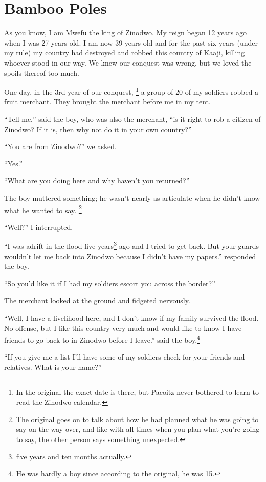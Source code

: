 \chapter{Bamboo Poles}

As you know, I am Mwefu the king of Zinodwo. My reign began 12 years ago when I was 27 years old. I am now 39 years old and for the past six years (under my rule) my country had destroyed and robbed this country of Kaaji, killing whoever stood in our way.
We knew our conquest was wrong, but we loved the spoils thereof too much.

One day, in the 3rd year of our conquest,
\footnote{In the original the exact date is there, but Pacoitz never bothered to learn to read the Zinodwo calendar.}
a group of 20 of my soldiers robbed a fruit merchant. They brought the merchant before me in my tent.

``Tell me,'' said the boy, who was also the merchant, ``is it right to rob a citizen of Zinodwo? If it is, then why not do it in your own country?''

``You are from Zinodwo?'' we asked.

``Yes.''

``What are you doing here and why haven't you returned?''

The boy muttered something; he wasn't nearly as articulate when he didn't know what he wanted to say. \footnote{The original goes on to talk about how he had planned what he was going to say on the way over, and like with all times when you plan what you're going to say, the other person says something unexpected.}

``Well?'' I interrupted.

``I was adrift in the flood five years\footnote{five years and ten months actually.} ago and I tried to get back. But your guards wouldn't let me back into Zinodwo because I didn't have my papers.'' responded the boy.

``So you'd like it if I had my soldiers escort you across the border?''

The merchant looked at the ground and fidgeted nervously.

``Well, I have a livelihood here, and I don't know if my family survived the flood. No offense, but I like this country very much and would like to know I have friends to go back to in Zinodwo before I leave.'' said the boy.\footnote{He was hardly a boy since according to the original, he was 15.}

``If you give me a list I'll have some of my soldiers check for your friends and relatives. What is your name?''

